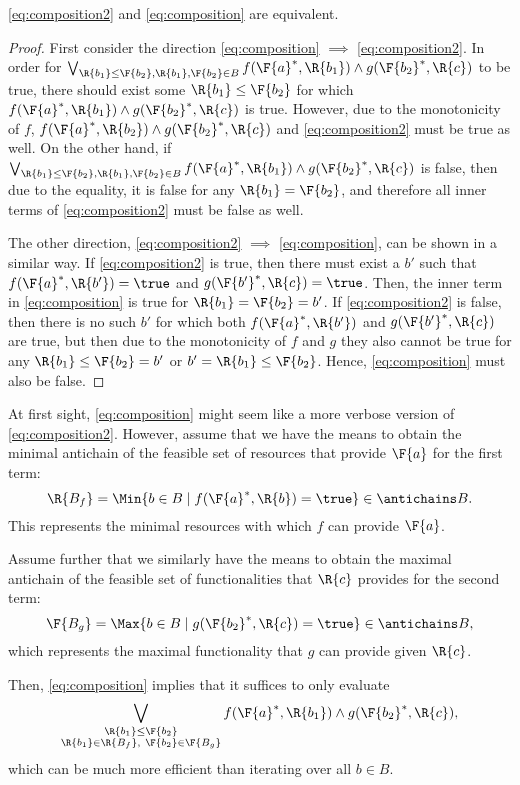 \begin{lemma}
\label{lemma:composition_equivalency}
\cref{eq:composition2} and \cref{eq:composition} are equivalent.
\end{lemma}

\begin{proof}
First consider the direction \cref{eq:composition} $\implies$ \cref{eq:composition2}. In order for $\bigvee_{\R{b_1}\leq\F{b_2}, \R{b_1},\F{b_2}\in B} f(\F{a}^*,\R{b_1}) \wedge g(\F{b_2}^*,\R{c})$ to be true, there should exist some $\R{b_1}\leq \F{b_2}$ for which $f(\F{a}^*,\R{b_1}) \wedge g(\F{b_2}^*,\R{c})$ is true. However, due to the monotonicity of $f$, $f(\F{a}^*,\R{b_2}) \wedge g(\F{b_2}^*,\R{c})$ and \cref{eq:composition2} must be true as well. On the other hand, if $\bigvee_{\R{b_1}\leq\F{b_2}, \R{b_1},\F{b_2}\in B} f(\F{a}^*,\R{b_1}) \wedge g(\F{b_2}^*,\R{c})$ is false, then due to the equality, it is false for any $\R{b_1}=\F{b_2}$, and therefore all inner terms of \cref{eq:composition2} must be false as well.

The other direction, \cref{eq:composition2} $\implies$ \cref{eq:composition}, can be shown in a similar way. If \cref{eq:composition2} is true, then there must exist a $b'$ such that $f(\F{a}^*, \R{b'})=\true$ and $g(\F{b'}^*, \R{c})=\true$. Then, the inner term in \cref{eq:composition} is true for $\R{b_1}=\F{b_2}=b'$. If \cref{eq:composition2} is false, then there is no such $b'$ for which both $f(\F{a}^*, \R{b'})$ and $g(\F{b'}^*, \R{c})$ are true, but then due to the monotonicity of $f$ and $g$ they also cannot be true for any $\R{b_1} \leq \F{b_2} = b'$ or $b'=\R{b_1} \leq \F{b_2}$. Hence, \cref{eq:composition} must also be false.
\end{proof}
\begin{remark}
At first sight, \cref{eq:composition} might seem like a more verbose version of \cref{eq:composition2}. However, assume that we have the means to obtain the minimal antichain of the feasible set of resources that provide $\F{a}$ for the first term:
\begin{equation}
    \R{B_f} = \Min \{b\in B \mid f(\F{a}^*,\R{b})=\true\} \in \antichains B.
\end{equation}
This represents the minimal resources with which $f$ can provide $\F{a}$.

Assume further that we similarly have the means to obtain the maximal antichain of the feasible set of functionalities that $\R{c}$ provides for the second term:
\begin{equation}
    \F{B_g} = \Max \{b\in B \mid g(\F{b_2}^*,\R{c})=\true\} \in \antichains B,
\end{equation}
which represents the maximal functionality that $g$ can provide given $\R{c}$.

Then, \cref{eq:composition} implies that it suffices to only evaluate
\begin{equation}
    \bigvee_{\substack{\R{b_1}\leq\F{b_2} \\ \R{b_1}\in \R{B_f},~ \F{b_2}\in\F{B_g} }} f(\F{a}^*,\R{b_1}) \wedge g(\F{b_2}^*,\R{c}),
\end{equation}
which can be much more efficient than iterating over all $b\in B$.
\end{remark}


